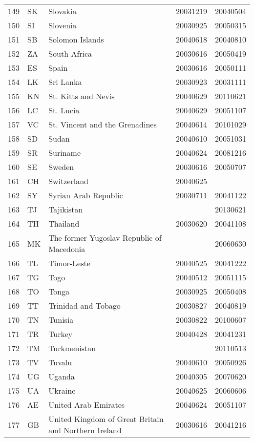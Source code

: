 \begin{longtable}{rllrr}
  149 & SK & Slovakia & 20031219 & 20040504 \\ 
  150 & SI & Slovenia & 20030925 & 20050315 \\ 
  151 & SB & Solomon Islands & 20040618 & 20040810 \\ 
  152 & ZA & South Africa & 20030616 & 20050419 \\ 
  153 & ES & Spain & 20030616 & 20050111 \\ 
  154 & LK & Sri Lanka & 20030923 & 20031111 \\ 
  155 & KN & St. Kitts and Nevis & 20040629 & 20110621 \\ 
  156 & LC & St. Lucia & 20040629 & 20051107 \\ 
  157 & VC & St. Vincent and the Grenadines & 20040614 & 20101029 \\ 
  158 & SD & Sudan & 20040610 & 20051031 \\ 
  159 & SR & Suriname & 20040624 & 20081216 \\ 
  160 & SE & Sweden & 20030616 & 20050707 \\ 
  161 & CH & Switzerland & 20040625 &  \\ 
  162 & SY & Syrian Arab Republic & 20030711 & 20041122 \\ 
  163 & TJ & Tajikistan &  & 20130621 \\ 
  164 & TH & Thailand & 20030620 & 20041108 \\ 
  165 & MK & The former Yugoslav Republic of Macedonia &  & 20060630 \\ 
  166 & TL & Timor-Leste & 20040525 & 20041222 \\ 
  167 & TG & Togo & 20040512 & 20051115 \\ 
  168 & TO & Tonga & 20030925 & 20050408 \\ 
  169 & TT & Trinidad and Tobago & 20030827 & 20040819 \\ 
  170 & TN & Tunisia & 20030822 & 20100607 \\ 
  171 & TR & Turkey & 20040428 & 20041231 \\ 
  172 & TM & Turkmenistan &  & 20110513 \\ 
  173 & TV & Tuvalu & 20040610 & 20050926 \\ 
  174 & UG & Uganda & 20040305 & 20070620 \\ 
  175 & UA & Ukraine & 20040625 & 20060606 \\ 
  176 & AE & United Arab Emirates & 20040624 & 20051107 \\ 
  177 & GB & United Kingdom of Great Britain and Northern Ireland & 20030616 & 20041216 \\ 

\end{longtable}
